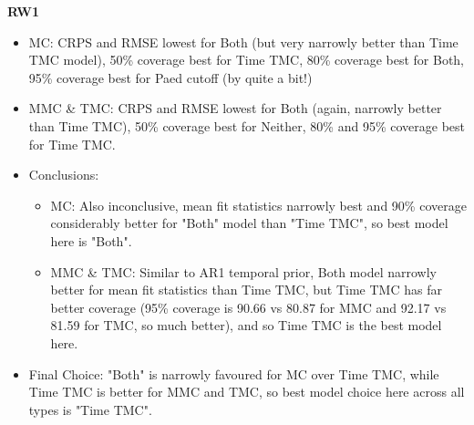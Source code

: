 \documentclass{article}
\begin{document}
\vspace{\bigskipamount}

\textbf{RW1}

\begin{itemize}
    \item MC: CRPS and RMSE lowest for Both (but very narrowly better than Time TMC model), 50\% coverage best for Time TMC, 80\% coverage best for Both, 95\% coverage best for Paed cutoff (by quite a bit!)
    \item MMC \& TMC: CRPS and RMSE lowest for Both (again, narrowly better than Time TMC), 50\% coverage best for Neither, 80\% and 95\% coverage best for Time TMC. 
    \item Conclusions:
    \begin{itemize}
        \item MC: Also inconclusive, mean fit statistics narrowly best and 90\% coverage considerably better for "Both" model than "Time TMC", so best model here is "Both". 
        \item MMC \& TMC: Similar to AR1 temporal prior, Both model narrowly better for mean fit statistics than Time TMC, but Time TMC has far better coverage (95\% coverage is 90.66 vs 80.87 for MMC and 92.17 vs 81.59 for TMC, so much better), and so Time TMC is the best model here.
    \end{itemize}
    \item Final Choice: "Both" is narrowly favoured for MC over Time TMC, while Time TMC is better for MMC and TMC, so best model choice here across all types is "Time TMC". 
\end{itemize}

\vspace{\bigskipamount}
  
\end{document}
